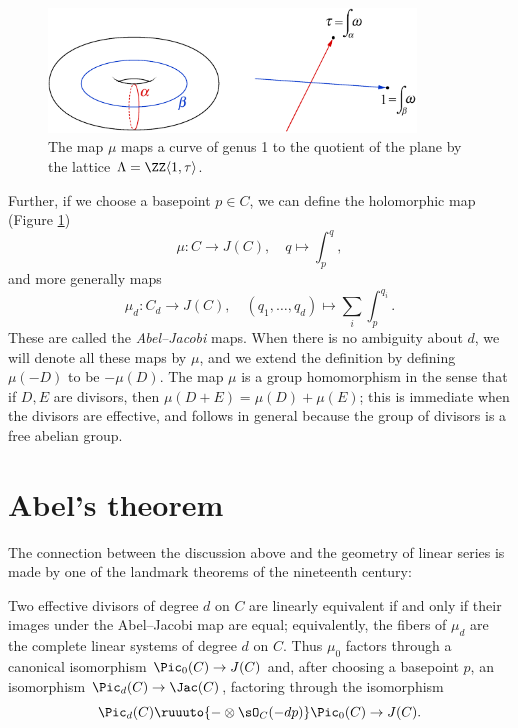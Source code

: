 \begin{figure}
\includegraphics[height=1.3in]{"main/Fig04-3"}
 \caption{The map $\mu$ maps a curve of genus 1 to the quotient of the plane by the lattice $\Lambda = \ZZ\langle 1,\tau\rangle$.}
\label{abeljacobi}
\end{figure}

Further, if we choose a basepoint  $p\in C$, we can define the holomorphic map (Figure \ref{abeljacobi})
%
$$
\mu  :  C  \to  J(C), \quad q\mapsto \int_{p}^{q},
$$
and more generally maps
$$
\mu_d
:  C_d  \to  J(C), \quad (q_1,\dots, q_d) \mapsto \sum_i \int_{p}^{q_i}.
$$
These
are called the \emph{Abel--Jacobi} maps. When there is no
%
ambiguity about $d$, we will denote all these maps  by $\mu$,  and
we extend the definition by defining $\mu(-D)$ to be $-\mu(D)$.
The map $\mu$ is a group homomorphism in the sense that if $D, E$ are divisors, then
$\mu (D+E) = \mu(D) + \mu(E)$; this is immediate when the divisors are effective, and
follows in general because the group of divisors is a free abelian group.

\section{Abel's theorem}

The connection between the discussion above and the geometry of linear
series is made by one of the landmark theorems of the nineteenth century:

\begin{theorem}\label{abel}
Two effective divisors of degree $d$ on $C$  are linearly
%
equivalent if and only if their images under the Abel--Jacobi map are
equal;
equivalently,
the fibers of $\mu_d$ are
the complete linear systems of degree $d$ on $C$. Thus $\mu_0$ factors
through a canonical isomorphism
$\Pic_0(C) \to J(C)$ and, after choosing a basepoint $p$, an
isomorphism $\Pic_d(C) \to \nobreak\Jac(C)$, factoring through the isomorphism
$$
\Pic_d(C) \ruuuto {-\otimes \sO_C(-dp)} \Pic_0(C) \to J(C).
$$
\end{theorem}

